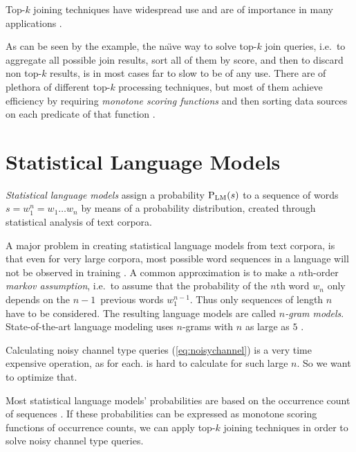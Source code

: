 \begin{draft}
Top-$k$ joining techniques have widespread use and are of importance in
many applications \noref.
\end{draft}

As can be seen by the example, the na\"{\i}ve way to solve top-$k$ join
queries, i.e.\ to aggregate all possible join results, sort all of them by
score, and then to discard non top-$k$ results, is in most cases far to
slow to be of any use.
There are of plethora of different top-$k$ processing techniques, but most
of them achieve efficiency by requiring \emph{monotone scoring functions} and
then sorting data sources on each predicate of that function
\parencite{Ilyas2008}.

\section{Statistical Language Models}

\emph{Statistical language models} assign a probability $\Prob[\text{LM}]{s}$ to
a sequence of words $s = w_1^n = w_1 \ldots w_n$ by means of a probability
distribution, created through statistical analysis of text corpora.

A major problem in creating statistical language models from text corpora, is
that even for very large corpora, most possible word sequences in a language
will not be observed in training \noref.
A common approximation is to make a $n$th-order \emph{markov assumption},
i.e.\ to assume that the probability of the $n$th word $w_n$ only depends on
the $n\!-\!1$~previous words $w_1^{n-1}$.
Thus only sequences of length $n$ have to be considered.
The resulting language models are called \emph{$n$-gram models}.
State-of-the-art language modeling uses $n$-grams with $n$ as large as $5$
\parencite{JurafskyMartin2009,Goodman2001}.

\begin{draft}
Calculating noisy channel type queries (\cref{eq:noisychannel}) is a very time
expensive operation, as for each.
 is hard to calculate for such large $n$.
So we want to optimize that.
\end{draft}

Most statistical language models' probabilities are based on the occurrence
count of sequences \noref.
If these probabilities can be expressed as monotone scoring functions of
occurrence counts, we can apply top-$k$ joining techniques in order to solve
noisy channel type queries.

